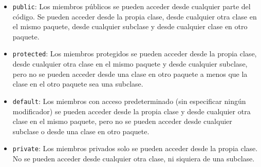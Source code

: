 \documentclass[executivepaper]{article}
\begin{document}
\begin{itemize}
\item \texttt{public}: Los miembros públicos se pueden acceder desde cualquier parte del código. Se pueden acceder desde la propia clase, desde cualquier otra clase en el mismo paquete, desde cualquier subclase y desde cualquier clase en otro paquete.
\item \texttt{protected}: Los miembros protegidos se pueden acceder desde la propia clase, desde cualquier otra clase en el mismo paquete y desde cualquier subclase, pero no se pueden acceder desde una clase en otro paquete a menos que la clase en el otro paquete sea una subclase.
\item \texttt{default}: Los miembros con acceso predeterminado (sin especificar ningún modificador) se pueden acceder desde la propia clase y desde cualquier otra clase en el mismo paquete, pero no se pueden acceder desde cualquier subclase o desde una clase en otro paquete.
\item \texttt{private}: Los miembros privados solo se pueden acceder desde la propia clase. No se pueden acceder desde cualquier otra clase, ni siquiera de una subclase.
\end{itemize}
\end{document}
